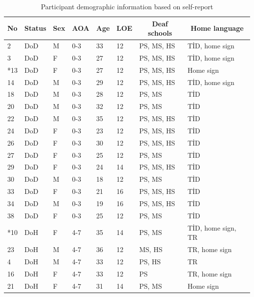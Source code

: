\documentclass[review]{elsarticle} %
\begin{document}
\begin{table}[hbt!]

\begin{center}
\begin{threeparttable}

\caption{\label{tab:unnamed-chunk-2}Participant demographic information based on self-report}

\small{

\begin{tabular}{llllllll}
\toprule
No & \multicolumn{1}{c}{Status} & \multicolumn{1}{c}{Sex} & \multicolumn{1}{c}{AOA} & \multicolumn{1}{c}{Age} & \multicolumn{1}{c}{LOE} & \multicolumn{1}{c}{Deaf schools} & \multicolumn{1}{c}{Home language}\\
\midrule
2 & DoD & M & 0-3 & 33 & 12 & PS, MS, HS & TİD, home sign\\
3 & DoD & F & 0-3 & 27 & 12 & PS, MS, HS & TİD, home sign\\
*13 & DoD & F & 0-3 & 27 & 12 & PS, MS, HS & Home sign\\
14 & DoD & M & 0-3 & 29 & 12 & PS, MS, HS & TİD, home sign\\
18 & DoD & M & 0-3 & 28 & 12 & PS, MS & TİD\\
20 & DoD & M & 0-3 & 32 & 12 & PS, MS & TİD\\
22 & DoD & M & 0-3 & 35 & 12 & PS, MS, HS & TİD\\
24 & DoD & F & 0-3 & 23 & 12 & PS, MS, HS & TİD\\
26 & DoD & F & 0-3 & 30 & 12 & PS, MS, HS & TİD\\
27 & DoD & F & 0-3 & 25 & 12 & PS, MS & TİD\\
29 & DoD & F & 0-3 & 24 & 14 & PS, MS, HS & TİD\\
30 & DoD & M & 0-3 & 18 & 12 & PS, MS & TİD\\
33 & DoD & F & 0-3 & 21 & 16 & PS, MS, HS & TİD\\
34 & DoD & M & 0-3 & 19 & 16 & PS, MS, HS & TİD\\
38 & DoD & F & 0-3 & 25 & 12 & PS, MS & TİD\\
*10 & DoH & F & 4-7 & 35 & 14 & PS, MS & TİD, home sign, TR\\
23 & DoH & M & 4-7 & 36 & 12 & MS, HS & TR, home sign\\
4 & DoH & M & 4-7 & 33 & 12 & PS, HS & TR\\
16 & DoH & F & 4-7 & 33 & 12 & PS & TR, home sign\\
21 & DoH & F & 4-7 & 31 & 14 & PS, MS & Home sign\\

\end{tabular}}
\end{threeparttable}
\end{center}
\end{table}
\end{document}
